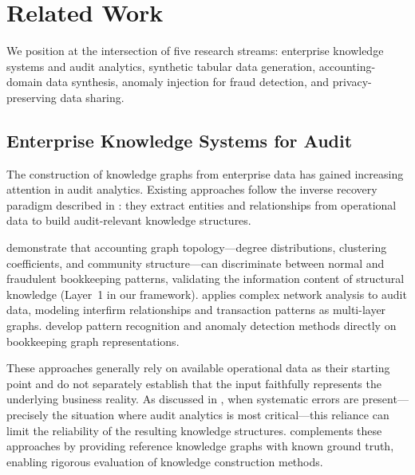 \section{Related Work}
\label{sec:related_work}

We position \system{} at the intersection of five research streams:
enterprise knowledge systems and audit analytics, synthetic tabular data
generation, accounting-domain data synthesis, anomaly injection for fraud
detection, and privacy-preserving data sharing.

\subsection{Enterprise Knowledge Systems for Audit}
\label{sec:rw_knowledge}

The construction of knowledge graphs from enterprise data has gained
increasing attention in audit analytics.  Existing approaches follow
the inverse recovery paradigm described in :
they extract entities and relationships from operational data to build
audit-relevant knowledge structures.

\citet{guo2022picture} demonstrate that accounting graph
topology---degree distributions, clustering coefficients, and community
structure---can discriminate between normal and fraudulent bookkeeping
patterns, validating the information content of structural knowledge
(Layer~1 in our framework).  \citet{boersma2024complex} applies complex
network analysis to audit data, modeling interfirm relationships and
transaction patterns as multi-layer graphs.
\citet{liang2021pattern} develop pattern recognition and anomaly detection
methods directly on bookkeeping graph representations.

These approaches generally rely on available operational data as
their starting point and do not separately establish that the input
faithfully represents the underlying business reality.  As discussed
in , when systematic errors are present---precisely
the situation where audit analytics is most critical---this reliance
can limit the reliability of the resulting knowledge structures.
\system{} complements these approaches by providing reference knowledge
graphs with known ground truth, enabling rigorous evaluation of
knowledge construction methods.


